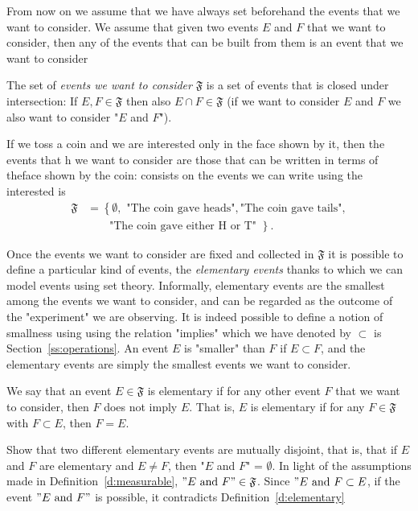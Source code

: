 From now on we assume that we have always set beforehand the events that we want to consider.  We assume that given two events $E$ and $F$ that we want to consider, then any of the events that can be built from them is an event that we want to consider
\begin{definition}
	\label{d:measurable}
	The set of \emph{events we want to consider} $\mathfrak F$ is a set of events that is closed under intersection: If $E, F  \in \mathfrak F$ then also $E\cap F \in \mathfrak F$ (if we want to consider $E$ and $F$ we also want to consider "$E$ and $F$"). 
\end{definition}

\begin{example}
	\label{ex:cointoss}
	If we toss a coin and we are interested only in the face shown by it, then the events that h we want to consider are those that can be written in terms of theface shown by the coin: consists on the events we can write using the   interested is 
	\begin{equation}
		\label{}
			\begin{split}
				\mathfrak F & = \left\{ \emptyset,\text{ "The coin gave heads"}, \text{"The coin gave tails"}, \right.\\
					& \qquad \left.\text{"The coin gave either H or T" }\right\}.
			\end{split}
	\end{equation}

\end{example}

Once the events we want to consider are fixed and collected in $\mathfrak F$ it is possible to define a particular kind of events, the \emph{elementary events} thanks to which we can model events using set theory. Informally, elementary events are the smallest among the events we want to consider, and can be regarded as the outcome of the "experiment" we are observing. It is indeed possible to define a notion of smallness using using the relation "implies" which we have denoted by $\subset$ is Section~\ref{ss:operations}. An event $E$ is "smaller" than $F$ if $E \subset F$, and the elementary events are simply the smallest events we want to consider.     
\begin{definition}
	\label{d:elementary}
	We say that an event $ E \in \mathfrak  F$  is elementary if for any other event $F$ that we want to consider, then $F$ does not imply $E$. That is, $E$ is elementary if for any $F \in \mathfrak F$ with $F \subset E$, then $ F = E$.  
\end{definition}
\begin{ExerciseList}
	\Exercise Show that two different elementary events are mutually disjoint, that is, that if $E$ and $F$ are elementary and $E \neq F$, then "$E$ and $F$" = $\emptyset$. 
	\Answer In light of the assumptions made in Definition~\ref{d:measurable}, $"E \text{ and } F " \in \mathfrak F$. Since $" E \textrm{ and } F \subset E$, if the event $"E \text{ and } F" $ is possible, it contradicts Definition~\ref{d:elementary}
\end{ExerciseList}

